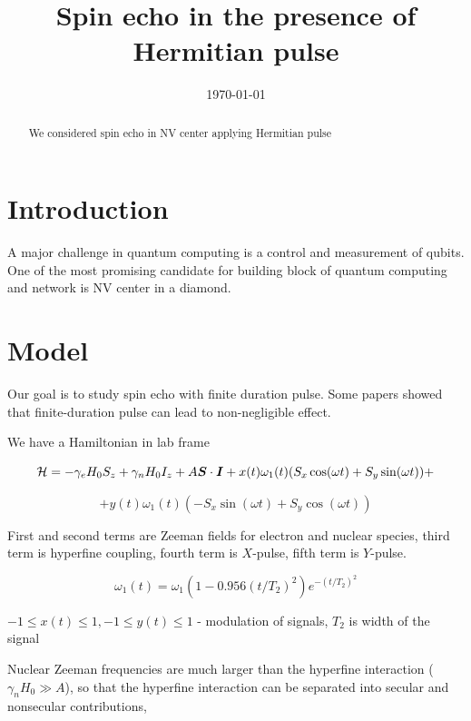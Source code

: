 \documentclass[
  onecolumn,
  aps,
  amsmath,
  amssymb,
  superscriptaddress,
  nofootinbib,
  floatfix
]{revtex4-2}
\newcommand{\0}{^{\phantom{\dagger}}}
\begin{document}
	
\title{Spin echo in the presence of Hermitian pulse}	


\date{\today}
\begin{abstract}

We considered spin echo in NV center applying Hermitian pulse
\end{abstract}
\maketitle
	
\section{Introduction}
A major challenge in quantum computing is a control and measurement of qubits. One of the most promising candidate for building block of quantum computing and network is NV center in a diamond.
\section{Model}


Our goal is to study spin echo with finite duration pulse. Some papers
showed that finite-duration pulse can lead to non-negligible effect.

We have a Hamiltonian in lab frame

\begin{equation}
{\cal H}=-\gamma_{e}H_{0}S_{z}+\gamma_{n}H_{0}I_{z}+A\boldsymbol{S}\cdot\boldsymbol{I}+x(t)\omega_{1}(t)(S_{x}\cos(\omega t)+S_{y}\sin(\omega t))+
\end{equation}

\[
+y(t)\omega_{1}(t)(-S_{x}\sin(\omega t)+S_{y}\cos(\omega t))
\]

First and second terms are Zeeman fields for electron and nuclear
species, third term is hyperfine coupling, fourth term is $X$-pulse,
fifth term is $Y$-pulse.

\begin{equation}
\omega_{1}(t)=\omega_{1}(1-0.956(t/T_{2})^{2})e^{-(t/T_{2})^{2}}
\end{equation}

$-1\leq x(t)\leq1,-1\leq y(t)\leq1$ - modulation of signals, $T_{2}$
is width of the signal

Nuclear Zeeman frequencies are much larger than the hyperfine interaction
($\gamma_{n}H_{0}\gg A$), so that the hyperfine interaction can be
separated into secular and nonsecular contributions,
\end{document}
